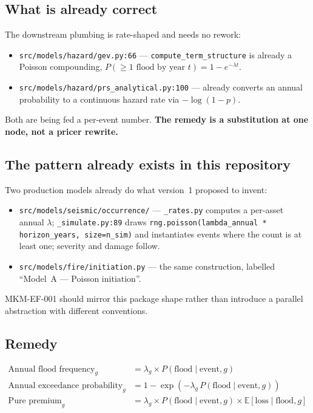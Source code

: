 \documentclass[11pt]{article}
\begin{document}
\subsection{What is already correct}

The downstream plumbing is rate-shaped and needs no rework:

\begin{itemize}[nosep]
  \item \texttt{src/models/hazard/gev.py:66} --- \texttt{compute\_term\_structure}
        is already a Poisson compounding,
        $P(\geq 1 \text{ flood by year } t) = 1 - e^{-\lambda t}$.
  \item \texttt{src/models/hazard/prs\_analytical.py:100} --- already converts an
        annual probability to a continuous hazard rate via $-\log(1-p)$.
\end{itemize}

\noindent Both are being fed a per-event number. \textbf{The remedy is a
substitution at one node, not a pricer rewrite.}

\subsection{The pattern already exists in this repository}

Two production models already do what version~1 proposed to invent:

\begin{itemize}[nosep]
  \item \texttt{src/models/seismic/occurrence/} --- \texttt{\_rates.py} computes a
        per-asset annual $\lambda$; \texttt{\_simulate.py:89} draws
        \texttt{rng.poisson(lambda\_annual * horizon\_years, size=n\_sim)} and
        instantiates events where the count is at least one; severity and damage
        follow.
  \item \texttt{src/models/fire/initiation.py} --- the same construction, labelled
        ``Model~A --- Poisson initiation''.
\end{itemize}

\noindent MKM-EF-001 should mirror this package shape rather than introduce a
parallel abstraction with different conventions.

\subsection{Remedy}

\begin{align}
\text{Annual flood frequency}_g &= \lambda_g \times P(\text{flood} \mid \text{event}, g) \\
\text{Annual exceedance probability}_g &= 1 - \exp\!\left(-\lambda_g \, P(\text{flood} \mid \text{event}, g)\right) \\
\text{Pure premium}_g &= \lambda_g \times P(\text{flood} \mid \text{event}, g) \times \mathbb{E}[\text{loss} \mid \text{flood}, g]
\end{align}
\end{document}
